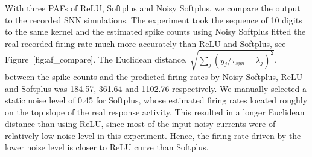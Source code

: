 \documentclass{article}
\begin{document}
With three PAFs of ReLU, Softplus and Noisy Softplus, we compare the output to the recorded SNN simulations.
The experiment took the sequence of 10 digits to the same kernel and the estimated spike counts using Noisy Softplus fitted the real recorded firing rate much more accurately than ReLU and Softplus, see Figure~\ref{fig:af_compare}.
The Euclidean distance, $\sqrt{\sum_{j}(y_j/\tau_{syn} - \lambda_j)^2}$, between the spike counts and the predicted firing rates by Noisy Softplus, ReLU and Softplus was 184.57, 361.64 and 1102.76 respectively.
We manually selected a static noise level of 0.45 for Softplus, whose estimated firing rates located roughly on the top slope of the real response activity.
This resulted in a longer Euclidean distance than using ReLU, since most of the input noisy currents were of relatively low noise level in this experiment.
Hence, the firing rate driven by the lower noise level is closer to ReLU curve than Softplus.
\end{document}
